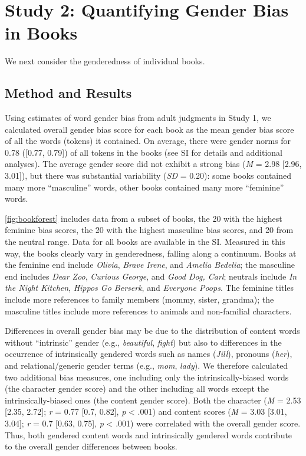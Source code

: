 \documentclass[english,,man,floatsintext]{apa6}
\begin{document}
\hypertarget{study-2-quantifying-gender-bias-in-books}{%
\section{Study 2: Quantifying Gender Bias in Books}\label{study-2-quantifying-gender-bias-in-books}}

We next consider the genderedness of individual books.

\hypertarget{method-and-results-1}{%
\subsection{Method and Results}\label{method-and-results-1}}

Using estimates of word gender bias from adult judgments in Study 1, we calculated overall gender bias score for each book as the mean gender bias score of all the words (tokens) it contained. On average, there were gender norms for 0.78 ({[}0.77, 0.79{]}) of all tokens in the books (see SI for details and additional analyses). The average gender score did not exhibit a strong bias (\emph{M} = 2.98 {[}2.96, 3.01{]}), but there was substantial variability (\emph{SD} = 0.20): some books contained many more \enquote{masculine} words, other books contained many more \enquote{feminine} words.

\autoref{fig:bookforest} includes data from a subset of books, the 20 with the highest feminine bias scores, the 20 with the highest masculine bias scores, and 20 from the neutral range. Data for all books are available in the SI. Measured in this way, the books clearly vary in genderedness, falling along a continuum. Books at the feminine end include \emph{Olivia}, \emph{Brave Irene}, and \emph{Amelia Bedelia}; the masculine end includes \emph{Dear Zoo}, \emph{Curious George}, and \emph{Good Dog, Carl}; neutrals include \emph{In the Night Kitchen}, \emph{Hippos Go Berserk}, and \emph{Everyone Poops}. The feminine titles include more references to family members (mommy, sister, grandma); the masculine titles include more references to animals and non-familial characters.

Differences in overall gender bias may be due to the distribution of content words without \enquote{intrinsic} gender (e.g., \emph{beautiful}, \emph{fight}) but also to differences in the occurrence of intrinsically gendered words such as names (\emph{Jill}), pronouns (\emph{her}), and relational/generic gender terms (e.g., \emph{mom}, \emph{lady}). We therefore calculated two additional bias measures, one including only the intrinsically-biased words (the character gender score) and the other including all words except the intrinsically-biased ones (the content gender score). Both the character (\emph{M} = 2.53 {[}2.35, 2.72{]}; \emph{r} = 0.77 {[}0.7, 0.82{]}, \emph{p} \textless{} .001) and content scores (\emph{M} = 3.03 {[}3.01, 3.04{]}; \emph{r} = 0.7 {[}0.63, 0.75{]}, \emph{p} \textless{} .001) were correlated with the overall gender score. Thus, both gendered content words and intrinsically gendered words contribute to the overall gender differences between books.
\end{document}
